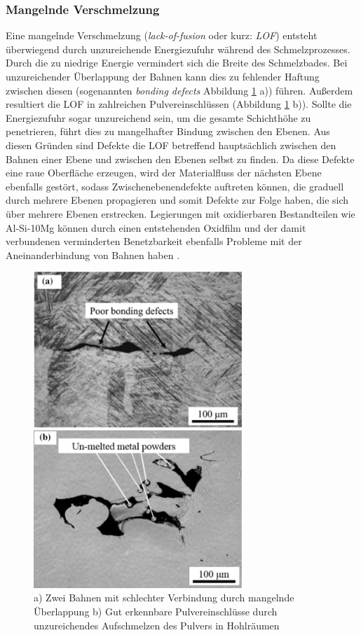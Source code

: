 		\subsubsection{Mangelnde Verschmelzung}
		Eine mangelnde Verschmelzung (\emph{lack-of-fusion} oder kurz: \emph{LOF}) entsteht
		überwiegend durch unzureichende Energiezufuhr während des Schmelzprozesses. Durch die zu
		niedrige Energie vermindert sich die Breite des Schmelzbades. Bei unzureichender
		Überlappung der Bahnen kann dies zu fehlender Haftung zwischen diesen (sogenannten
		\emph{bonding defects} Abbildung \ref{fig:defects_lof} a)) führen. Außerdem resultiert
		die LOF in zahlreichen Pulvereinschlüssen (Abbildung \ref{fig:defects_lof} b)). Sollte die
		Energiezufuhr sogar unzureichend sein, um die gesamte Schichthöhe zu penetrieren, führt
		dies zu mangelhafter Bindung zwischen den Ebenen. Aus diesen Gründen sind Defekte die
		LOF betreffend hauptsächlich zwischen den Bahnen einer Ebene und zwischen den Ebenen
		selbst zu finden. Da diese Defekte eine raue Oberfläche erzeugen, wird der Materialfluss
		der nächsten Ebene ebenfalls gestört, sodass Zwischenebenendefekte auftreten können, die
		graduell durch mehrere Ebenen propagieren und somit Defekte zur Folge haben, die sich über
		mehrere Ebenen erstrecken. Legierungen mit oxidierbaren Bestandteilen wie Al-Si-10Mg
		können durch einen entstehenden Oxidfilm und der damit verbundenen verminderten
		Benetzbarkeit ebenfalls Probleme mit der Aneinanderbindung von Bahnen haben
		\cite{zhang2017defect}.

		\begin{figure}[!ht]
			\centering
			\includegraphics[width=0.7\textwidth]{chapter/main/img/defects/lack_of_fusion.png}
			\caption{a) Zwei Bahnen mit schlechter Verbindung durch mangelnde Überlappung
			b) Gut erkennbare Pulvereinschlüsse durch unzureichendes Aufschmelzen des Pulvers
			in Hohlräumen \cite{zhang2017defect}}
			\label{fig:defects_lof}
		\end{figure}

